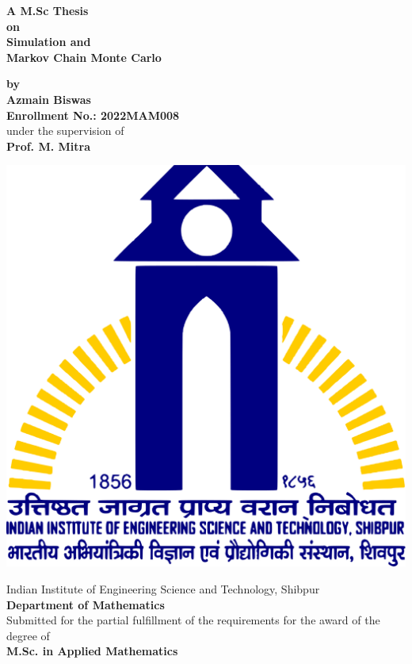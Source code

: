 \begin{titlepage}
    \begin{center}


        \Large{\textbf{A M.Sc Thesis\\ on}}\\
        \huge{\textbf{Simulation and \\ Markov Chain Monte Carlo}}

        \vspace{0.2cm}
        \large{\textbf{by}}\\ 
        \Large{\textbf{Azmain Biswas}}\\ 
        \Large{\textbf{Enrollment No.: 2022MAM008}}\\ 
        \Large{under the supervision of}\\ 
        \Large{\textbf{Prof. M. Mitra}}

        \vspace{1cm}

        \includegraphics[scale = 0.1]{images/IIEST_Shibpur_Logo.svg.png}

        \vspace{0.2cm}

        \Large{{
                Indian Institute of Engineering Science and Technology, Shibpur\\ 
                \textbf{Department of Mathematics}
        }}\\
        \vspace*{0.5cm}
        \large{{Submitted for the partial fulfillment of the requirements for the award of the degree of}}\\
        \Large{\textbf{M.Sc. in Applied Mathematics}}
    \end{center}
\end{titlepage}
